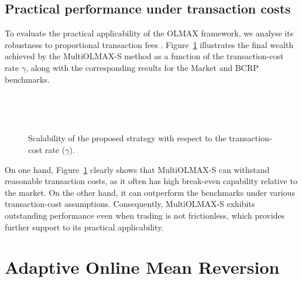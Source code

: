 \subsection{Practical performance under transaction costs}
\label{sec:transaction-costs}

To evaluate the practical applicability of the OLMAX framework, we analyse its robustness to proportional transaction fees \citep{borodin04}. Figure~\ref{fig:multiolmax-transaction-cost-sensitivity} illustrates the final wealth achieved by the MultiOLMAX-S method as a function of the transaction-cost rate $\gamma$, along with the corresponding results for the Market and BCRP benchmarks.
\begin{figure}%
\caption{Scalability of the proposed strategy with respect to the transaction-cost rate ($\gamma$).}
\label{fig:multiolmax-transaction-cost-sensitivity}
    \,
    \,
    
    \,
    \,
\end{figure}

On one hand, Figure~\ref{fig:multiolmax-transaction-cost-sensitivity} clearly shows that MultiOLMAX-S can withstand reasonable transaction costs, as it often has high break-even capability relative to the market. On the other hand, it can outperform the benchmarks under various transaction-cost assumptions. Consequently, MultiOLMAX-S exhibits outstanding performance even when trading is not frictionless, which provides further support to its practical applicability.


\section{Adaptive Online Mean Reversion}
\label{sec:ada-mr}

